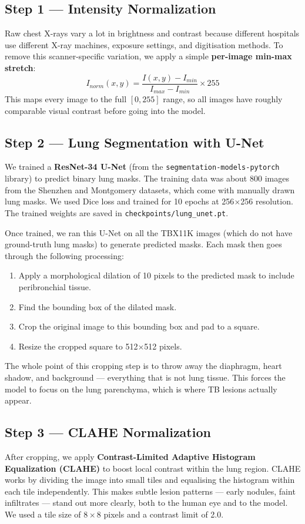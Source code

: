 \documentclass[12pt]{report}
\begin{document}
\subsection{Step 1 --- Intensity Normalization}
Raw chest X-rays vary a lot in brightness and contrast because different hospitals use different X-ray machines, exposure settings, and digitisation methods. To remove this scanner-specific variation, we apply a simple \textbf{per-image min-max stretch}:
\begin{equation}
I_{norm}(x,y) = \frac{I(x,y) - I_{min}}{I_{max} - I_{min}} \times 255
\end{equation}
This maps every image to the full $[0, 255]$ range, so all images have roughly comparable visual contrast before going into the model.

\subsection{Step 2 --- Lung Segmentation with U-Net}
We trained a \textbf{ResNet-34 U-Net} (from the \texttt{segmentation-models-pytorch} library) to predict binary lung masks. The training data was about 800 images from the Shenzhen and Montgomery datasets, which come with manually drawn lung masks. We used Dice loss and trained for 10 epochs at 256$\times$256 resolution. The trained weights are saved in \texttt{checkpoints/lung\_unet.pt}.

Once trained, we ran this U-Net on all the TBX11K images (which do not have ground-truth lung masks) to generate predicted masks. Each mask then goes through the following processing:
\begin{enumerate}
    \item Apply a morphological dilation of 10 pixels to the predicted mask to include peribronchial tissue.
    \item Find the bounding box of the dilated mask.
    \item Crop the original image to this bounding box and pad to a square.
    \item Resize the cropped square to 512$\times$512 pixels.
\end{enumerate}

The whole point of this cropping step is to throw away the diaphragm, heart shadow, and background --- everything that is not lung tissue. This forces the model to focus on the lung parenchyma, which is where TB lesions actually appear.

\subsection{Step 3 --- CLAHE Normalization}
After cropping, we apply \textbf{Contrast-Limited Adaptive Histogram Equalization (CLAHE)} to boost local contrast within the lung region. CLAHE works by dividing the image into small tiles and equalising the histogram within each tile independently. This makes subtle lesion patterns --- early nodules, faint infiltrates --- stand out more clearly, both to the human eye and to the model. We used a tile size of $8\times8$ pixels and a contrast limit of 2.0.
\end{document}
